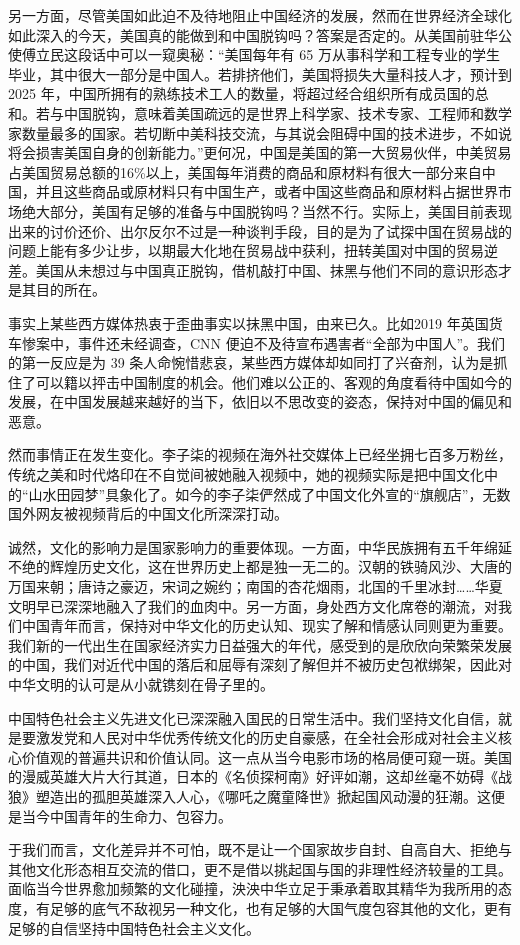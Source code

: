 \documentclass{ctexart}
\begin{document}
另一方面，尽管美国如此迫不及待地阻止中国经济的发展，然而在世界经济全球化如此深入的今天，美国真的能做到和中国脱钩吗？答案是否定的。从美国前驻华公使傅立民这段话中可以一窥奥秘：“美国每年有 65 万从事科学和工程专业的学生毕业，其中很大一部分是中国人。若排挤他们，美国将损失大量科技人才，预计到 2025 年，中国所拥有的熟练技术工人的数量，将超过经合组织所有成员国的总和。若与中国脱钩，意味着美国疏远的是世界上科学家、技术专家、工程师和数学家数量最多的国家。若切断中美科技交流，与其说会阻碍中国的技术进步，不如说将会损害美国自身的创新能力。”更何况，中国是美国的第一大贸易伙伴，中美贸易占美国贸易总额的16\%以上，美国每年消费的商品和原材料有很大一部分来自中国，并且这些商品或原材料只有中国生产，或者中国这些商品和原材料占据世界市场绝大部分，美国有足够的准备与中国脱钩吗？当然不行。实际上，美国目前表现出来的讨价还价、出尔反尔不过是一种谈判手段，目的是为了试探中国在贸易战的问题上能有多少让步，以期最大化地在贸易战中获利，扭转美国对中国的贸易逆差。美国从未想过与中国真正脱钩，借机敲打中国、抹黑与他们不同的意识形态才是其目的所在。

事实上某些西方媒体热衷于歪曲事实以抹黑中国，由来已久。比如2019 年英国货车惨案中，事件还未经调查，CNN 便迫不及待宣布遇害者“全部为中国人”。我们的第一反应是为 39 条人命惋惜悲哀，某些西方媒体却如同打了兴奋剂，认为是抓住了可以籍以抨击中国制度的机会。他们难以公正的、客观的角度看待中国如今的发展，在中国发展越来越好的当下，依旧以不思改变的姿态，保持对中国的偏见和恶意。

然而事情正在发生变化。李子柒的视频在海外社交媒体上已经坐拥七百多万粉丝，传统之美和时代烙印在不自觉间被她融入视频中，她的视频实际是把中国文化中的“山水田园梦”具象化了。如今的李子柒俨然成了中国文化外宣的“旗舰店”，无数国外网友被视频背后的中国文化所深深打动。

诚然，文化的影响力是国家影响力的重要体现。一方面，中华民族拥有五千年绵延不绝的辉煌历史文化，这在世界历史上都是独一无二的。汉朝的铁骑风沙、大唐的万国来朝；唐诗之豪迈，宋词之婉约；南国的杏花烟雨，北国的千里冰封……华夏文明早已深深地融入了我们的血肉中。另一方面，身处西方文化席卷的潮流，对我们中国青年而言，保持对中华文化的历史认知、现实了解和情感认同则更为重要。我们新的一代出生在国家经济实力日益强大的年代，感受到的是欣欣向荣繁荣发展的中国，我们对近代中国的落后和屈辱有深刻了解但并不被历史包袱绑架，因此对中华文明的认可是从小就镌刻在骨子里的。

中国特色社会主义先进文化已深深融入国民的日常生活中。我们坚持文化自信，就是要激发党和人民对中华优秀传统文化的历史自豪感，在全社会形成对社会主义核心价值观的普遍共识和价值认同。这一点从当今电影市场的格局便可窥一斑。美国的漫威英雄大片大行其道，日本的《名侦探柯南》好评如潮，这却丝毫不妨碍《战狼》塑造出的孤胆英雄深入人心，《哪吒之魔童降世》掀起国风动漫的狂潮。这便是当今中国青年的生命力、包容力。

于我们而言，文化差异并不可怕，既不是让一个国家故步自封、自高自大、拒绝与其他文化形态相互交流的借口，更不是借以挑起国与国的非理性经济较量的工具。面临当今世界愈加频繁的文化碰撞，泱泱中华立足于秉承着取其精华为我所用的态度，有足够的底气不敌视另一种文化，也有足够的大国气度包容其他的文化，更有足够的自信坚持中国特色社会主义文化。
\end{document}
